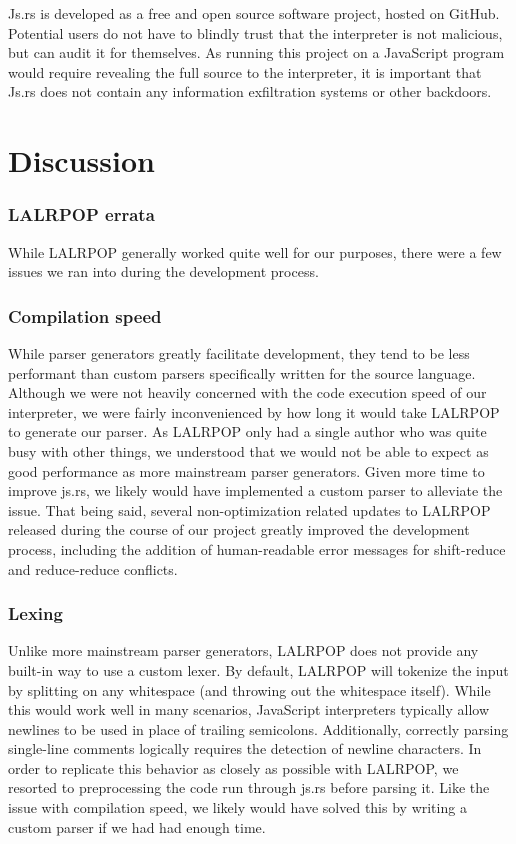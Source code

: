 \documentclass{article}
\begin{document}
\begin{multicols}{2}
Js.rs is developed as a free and open source software project, hosted on GitHub.
Potential users do not have to blindly trust that the interpreter is not
malicious, but can audit it for themselves. As running this project on a
JavaScript program would require revealing the full source to the interpreter,
it is important that Js.rs does not contain any information exfiltration systems
or other backdoors.

\section{Discussion}

\subsubsection*{LALRPOP errata}

While LALRPOP generally worked quite well for our purposes, there were a few
issues we ran into during the development process.

\subsubsection*{Compilation speed}

While parser generators greatly facilitate development, they tend to be less
performant than custom parsers specifically written for the source language.
Although we were not heavily concerned with the code execution speed of our
interpreter, we were fairly inconvenienced by how long it would take LALRPOP to
generate our parser. As LALRPOP only had a single author who was quite busy with
other things, we understood that we would not be able to expect as good
performance as more mainstream parser generators. Given more time to improve
js.rs, we likely would have implemented a custom parser to alleviate the issue.
That being said, several non-optimization related updates to LALRPOP released
during the course of our project greatly improved the development process,
including the addition of human-readable error messages for shift-reduce and
reduce-reduce conflicts.

\subsubsection*{Lexing}

Unlike more mainstream parser generators, LALRPOP does not provide any built-in
way to use a custom lexer. By default, LALRPOP will tokenize the input by
splitting on any whitespace (and throwing out the whitespace itself). While this
would work well in many scenarios, JavaScript interpreters typically allow
newlines to be used in place of trailing semicolons. Additionally, correctly
parsing single-line comments logically requires the detection of newline
characters. In order to replicate this behavior as closely as possible with
LALRPOP, we resorted to preprocessing the code run through js.rs before parsing
it. Like the issue with compilation speed, we likely would have solved this by
writing a custom parser if we had had enough time.


\end{multicols}
\end{document}
